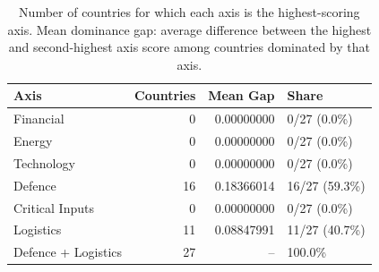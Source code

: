 \begin{table}[htbp]
\centering
\caption{Number of countries for which each axis is the highest-scoring axis.  Mean dominance gap: average difference between the highest and second-highest axis score among countries dominated by that axis.}
\label{tab:dominance-counts}
\begin{tabular}{@{}l r r l@{}}
\toprule
\textbf{Axis} & \textbf{Countries} & \textbf{Mean Gap} & \textbf{Share} \\
\midrule
  Financial & 0 & 0.00000000 & 0/27 (0.0\%) \\
  Energy & 0 & 0.00000000 & 0/27 (0.0\%) \\
  Technology & 0 & 0.00000000 & 0/27 (0.0\%) \\
  Defence & 16 & 0.18366014 & 16/27 (59.3\%) \\
  Critical Inputs & 0 & 0.00000000 & 0/27 (0.0\%) \\
  Logistics & 11 & 0.08847991 & 11/27 (40.7\%) \\
\midrule
  Defence + Logistics & 27 & {--} & 100.0\% \\
\bottomrule
\end{tabular}
\end{table}